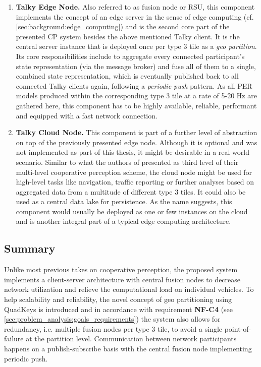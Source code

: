 \begin{enumerate}[C1: ]
	\item \textbf{Talky Edge Node.} Also referred to as fusion node or RSU, this component implements the concept of an edge server in the sense of edge computing (cf. \cref{sec:background:edge_computing}) and is the second core part of the presented CP system besides the above mentioned Talky client. It is the central server instance that is deployed once per type 3 tile as a \textit{geo partition}. Its core responsibilities include to aggregate every connected participant's state representation (via the message broker) and fuse all of them to a single, combined state representation, which is eventually published back to all connected Talky clients again, following a \textit{periodic push} pattern. As all PER models produced within the corresponding type 3 tile at a rate of 5-20 \si{\hertz} are gathered here, this component has to be highly available, reliable, performant and equipped with a fast network connection.
	\item \textbf{Talky Cloud Node.} This component is part of a further level of abstraction on top of the previously presented edge node. Although it is optional and was not implemented as part of this thesis, it might be desirable in a real-world scenario. Similar to what the authors of \cite{Calvo2017} presented as third level of their multi-level cooperative perception scheme, the cloud node might be used for high-level tasks like navigation, traffic reporting or further analyses based on aggregated data from a multitude of different type 3 tiles. It could also be used as a central data lake for persistence. As the name suggests, this component would usually be deployed as one or few instances on the cloud and is another integral part of a typical edge computing architecture. 
\end{enumerate}

\subsection{Summary}
\label{subsec:concept_design:summary}
Unlike most previous takes on cooperative perception, the proposed system implements a client-server architecture with central fusion nodes to decrease network utilization and relieve the computational load on individual vehicles. To help scalability and reliability, the novel concept of geo partitioning using QuadKeys is introduced and in accordance with requirement \textbf{NF-C4} (see \cref{sec:problem_analysis:goals_requirements}) the system also allows for redundancy, i.e. multiple fusion nodes per type 3 tile, to avoid a single point-of-failure at the partition level. Communication between network participants happens on a publish-subscribe basis with the central fusion node implementing periodic push.


